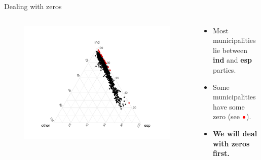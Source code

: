 \documentclass[9pt]{beamer}
\begin{document}
\begin{frame}{Dealing with zeros}

\begin{columns}
\begin{column}{0.5\textwidth}
\begin{figure}\vspace{-0.20cm}
\includegraphics[trim=0cm 0cm 0cm 0cm,width=1.2\textwidth]{ternary_original.pdf}
\end{figure}
\end{column}
\begin{column}{0.5\textwidth}
\begin{itemize}
\item Most municipalities lie between \textbf{ind} and \textbf{esp} parties.
\item Some municipalities have some zero (see ${\color{RED}\bullet}$).
\item<2>[$\rightarrow$] \textbf{We will deal with zeros first.}
\end{itemize}
\end{column}
\end{columns}

\end{frame}
\end{document}
